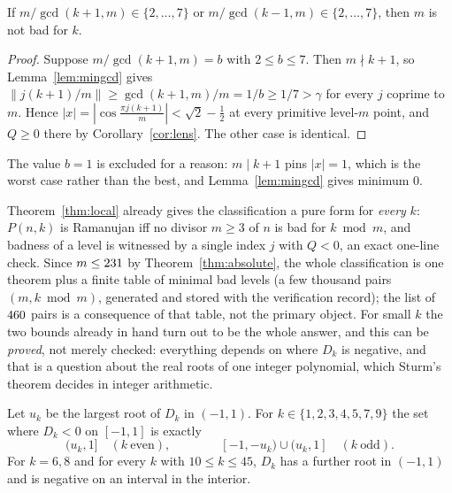 \begin{theorem}\label{thm:gcdsafe}
If $m/\gcd(k+1,m)\in\{2,\dots,7\}$ or $m/\gcd(k-1,m)\in\{2,\dots,7\}$, then $m$
is not bad for $k$.
\end{theorem}

\begin{proof}
Suppose $m/\gcd(k+1,m)=b$ with $2\le b\le7$. Then $m\nmid k+1$, so
Lemma~\ref{lem:mingcd} gives $\|j(k+1)/m\|\ge\gcd(k+1,m)/m=1/b\ge1/7>\gamma$ for
every $j$ coprime to $m$. Hence $|x|=|\cos\frac{\pi j(k+1)}{m}|<\sqrt2-\tfrac12$
at every primitive level-$m$ point, and $Q\ge0$ there by
Corollary~\ref{cor:lens}. The other case is identical.
\end{proof}

The value $b=1$ is excluded for a reason: $m\mid k+1$ pins $|x|=1$, which is the
worst case rather than the best, and Lemma~\ref{lem:mingcd} gives minimum $0$.

Theorem~\ref{thm:local} already gives the classification a pure form for
\emph{every} $k$: $P(n,k)$ is Ramanujan iff no divisor $m\ge3$ of $n$ is bad
for $k\bmod m$, and badness of a level is witnessed by a single index $j$ with
$Q<0$, an exact one-line check. Since $m\le231$ by
Theorem~\ref{thm:absolute}, the whole classification is one theorem plus a
finite table of minimal bad levels (a few thousand pairs $(m,k\bmod m)$,
generated and stored with the verification record); the list of
$460$ pairs is a consequence of that table, not the primary object.
For small $k$ the two bounds already in hand turn out to be the whole answer,
and this can be \emph{proved}, not merely checked: everything depends on where
$D_k$ is negative, and that is a question about the real roots of one integer
polynomial, which Sturm's theorem decides in integer arithmetic.

\begin{lemma}\label{lem:bands}
Let $u_k$ be the largest root of $D_k$ in $(-1,1)$. For
$k\in\{1,2,3,4,5,7,9\}$ the set where $D_k<0$ on $[-1,1]$ is exactly
\[
  (u_k,1]\quad(k\ \text{even}),\qquad\qquad [-1,-u_k)\cup(u_k,1]\quad(k\ \text{odd}).
\]
For $k=6,8$ and for every $k$ with $10\le k\le45$, $D_k$ has a further root in
$(-1,1)$ and is negative on an interval in the interior.
\end{lemma}

